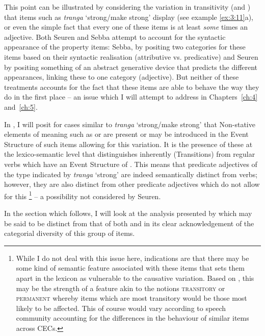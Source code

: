 This point can be illustrated by considering the variation in
transitivity (and ) that items such as \textit{tranga}
`strong\slash make strong' display (see example \ref{ex:3:11}a), or even the simple
fact that every one of these items is at least \textit{some} times an
adjective.  Both Seuren and Sebba attempt to account for the syntactic
appearance of the property items: Sebba, by positing two categories
for these items based on their syntactic realisation (attributive
vs. predicative) and Seuren by positing something of an abstract
generative device that predicts the different appearances, linking
these to one category (adjective).  But neither of these treatments
accounts for the fact that these items are able to behave the way they
do in the first place -- an issue which I will attempt to address in
Chapters~\ref{ch:4} and~\ref{ch:5}.\largerpage[1.5]

In , I will posit for cases similar to
\textit{tranga} `strong\slash make strong' that Non-stative elements of
{\textup{meaning}} such as \CAUSE or \BECOME are present or may be
introduced in the Event Structure of such items allowing for this
variation.  It is the presence of these at the lexico-semantic level
that distinguishes inherently  (Transitions) from
regular  verbs which have an Event Structure of .  This
means that predicate adjectives of the type indicated by
\textit{tranga} `strong' are indeed semantically distinct from 
verbs; however, they are also distinct from other predicate adjectives
which do not allow for this \footnote{While I do
  not deal with this issue here, indications are that there may be
  some kind of semantic feature associated with these items that sets
  them apart in the lexicon as vulnerable to the causative
  variation. Based on \citet{Winford1993}, this may be the strength of
  a feature akin to the notions \textsc{transitory} or \textsc{permanent} whereby items
  which are most transitory would be those most likely to be
  affected. This of course would vary according to speech community
  accounting for the differences in the behaviour of similar items
  across CECs.} – a possibility not considered by Seuren.

In the section which follows, I will look at the analysis presented by
\citet{Kouwenberg1996} which may be said to be distinct from that of
both \citet{Sebba1986} and \citet{Seuren1986} in its clear acknowledgement
of the categorial diversity of this group of items.

